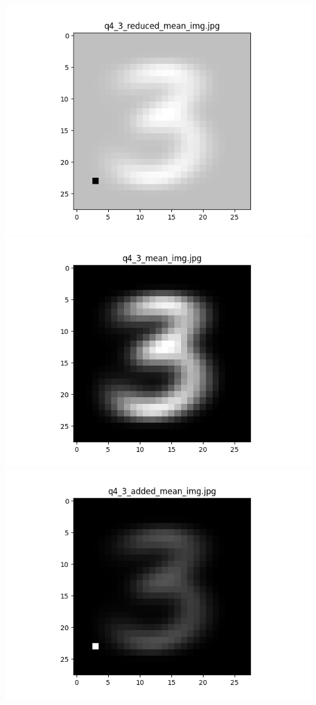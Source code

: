 \documentclass{article}
\begin{document}
    \\
    \includegraphics[scale=.37]{../results/q4/reduced_mean_images/q4_3_reduced_mean_img.png}
    \includegraphics[scale=.37]{../results/q4/mean_images/q4_3_mean_img.png}
    \includegraphics[scale=.37]{../results/q4/added_mean_images/q4_3_added_mean_img.png}
\end{document}
